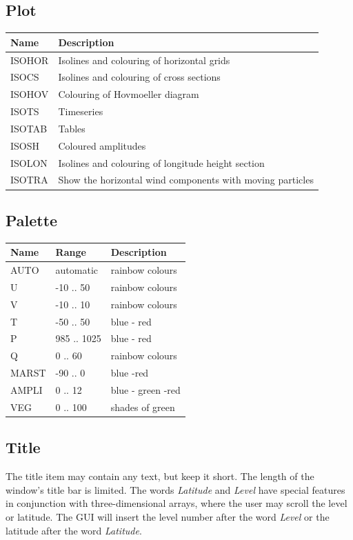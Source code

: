 \subsection{Plot}
\begin{tabular}{|l|l|}
\hline
Name     & Description \\
\hline
   ISOHOR & Isolines and colouring of horizontal grids \\
   ISOCS &  Isolines and colouring of cross sections \\
   ISOHOV & Colouring of Hovmoeller diagram \\
   ISOTS &  Timeseries \\
   ISOTAB & Tables \\
   ISOSH &  Coloured amplitudes \\
   ISOLON & Isolines and colouring of longitude height section \\
   ISOTRA & Show the horizontal wind components with moving particles \\
\hline
\end{tabular}

\subsection{Palette}
\begin{tabular}{|l|l|l|}
\hline
Name     & Range & Description  \\
\hline
   AUTO & automatic & rainbow colours \\
   U &    -10 .. 50 & rainbow colours \\
   V &    -10 .. 10 & rainbow colours \\
   T &    -50 .. 50 & blue - red \\
   P &    985 .. 1025 & blue - red \\ 
   Q &      0 .. 60 & rainbow colours \\
   MARST & -90 .. 0 & blue -red \\
   AMPLI & 0 .. 12 & blue - green -red \\
   VEG   & 0 .. 100 & shades of green \\
\hline
\end{tabular}

\subsection{Title}
The title item may contain any text, but keep it short.
The length of the window's title bar is limited.
The words {\em Latitude} and {\em Level} have special
features in conjunction with three-dimensional arrays,
where the user may scroll the level or latitude.
The GUI will insert the level number after the word 
{\em Level} or the latitude after the word {\em Latitude}.

